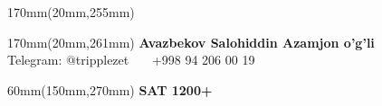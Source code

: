\documentclass[a4paper]{article}
\begin{document}
\begin{textblock*}{170mm}(20mm,255mm)
\end{textblock*}

\begin{textblock*}{170mm}(20mm,261mm)
{\sffamily\fontsize{10.5}{15}\selectfont\color{ink}
\textbf{Avazbekov Salohiddin Azamjon o'g'li} \\[1mm]
{\fontsize{9.5}{14}\selectfont\color{black!55} Telegram: @tripplezet \ \textperiodcentered\ \ +998 94 206 00 19}
}
\end{textblock*}

\begin{textblock*}{60mm}(150mm,270mm)
{\sffamily\bfseries\fontsize{15}{18}\selectfont\color{accent} SAT 1200+}
\end{textblock*}
\end{document}

